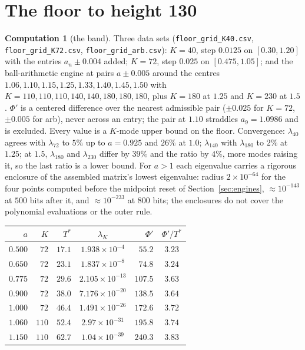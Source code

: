 \documentclass[11pt]{article}
\theoremstyle{definition}
\newtheorem{computation}[theorem]{Computation}
\theoremstyle{remark}
\newcommand{\Tst}{T^{*}}
\begin{document}
\section{The floor to height 130}\label{sec:grid}

\begin{computation}[the band]\label{comp:grid}
Three data sets (\texttt{floor\_grid\_K40.csv}, \texttt{floor\_grid\_K72.csv}, \texttt{floor\_grid\_arb.csv}): $K=40$, step $0.0125$ on $[0.30,1.20]$ with the entries $a_n\pm0.004$ added; $K=72$, step $0.025$ on $[0.475,1.05]$; and the ball-arithmetic engine at pairs $a\pm0.005$ around the centres $1.06,1.10,1.15,1.25,1.33,1.40,1.45,1.50$ with $K=110,110,110,140,140,180,180,180$, plus $K=180$ at $1.25$ and $K=230$ at $1.5$. $\Phi'$ is a centered difference over the nearest admissible pair ($\pm0.025$ for $K=72$, $\pm0.005$ for arb), never across an entry; the pair at $1.10$ straddles $a_9=1.0986$ and is excluded. Every value is a $K$-mode upper bound on the floor. Convergence: $\lambda_{40}$ agrees with $\lambda_{72}$ to $5\%$ up to $a=0.925$ and $26\%$ at $1.0$; $\lambda_{140}$ with $\lambda_{180}$ to $2\%$ at $1.25$; at $1.5$, $\lambda_{180}$ and $\lambda_{230}$ differ by $39\%$ and the ratio by $4\%$, more modes raising it, so the last ratio is a lower bound. For $a>1$ each eigenvalue carries a rigorous enclosure of the assembled matrix's lowest eigenvalue: radius $2\times10^{-64}$ for the four points computed before the midpoint reset of Section~\ref{sec:engines}, $\approx10^{-143}$ at $500$ bits after it, and $\approx10^{-233}$ at $800$ bits; the enclosures do not cover the polynomial evaluations or the outer rule.
\begin{center}
\begin{tabular}{@{}rrrcrc@{}}
\toprule
$a$ & $K$ & $\Tst$ & $\lambda_K$ & $\Phi'$ & $\Phi'/\Tst$\\
\midrule
$0.500$ & $72$ & $17.1$ & $1.938\times10^{-4}$ & $55.2$ & $3.23$\\
$0.650$ & $72$ & $23.1$ & $1.837\times10^{-8}$ & $74.8$ & $3.24$\\
$0.775$ & $72$ & $29.6$ & $2.105\times10^{-13}$ & $107.5$ & $3.63$\\
$0.900$ & $72$ & $38.0$ & $7.176\times10^{-20}$ & $138.5$ & $3.64$\\
$1.000$ & $72$ & $46.4$ & $1.491\times10^{-26}$ & $172.6$ & $3.72$\\
$1.060$ & $110$ & $52.4$ & $2.97\times10^{-31}$ & $195.8$ & $3.74$\\
$1.150$ & $110$ & $62.7$ & $1.04\times10^{-39}$ & $240.3$ & $3.83$\\

\end{tabular}
\end{center}
\end{computation}
\end{document}

